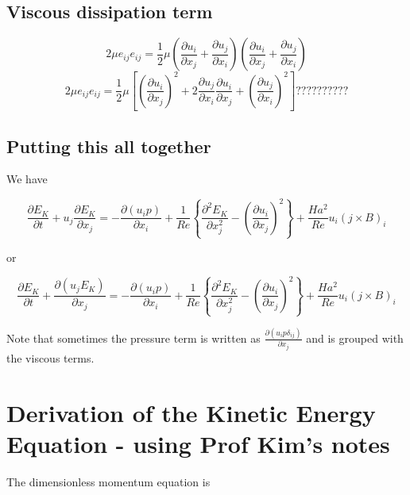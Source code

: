 \documentclass[11pt]{article}
\newcommand{\PD}{\partial}
\begin{document}
\subsection{Viscous dissipation term}
\begin{equation}
	2 \mu e_{ij} e_{ij} = \frac{1}{2} \mu 
	\left( 
	\frac{\PD u_i}{\PD x_j} + \frac{\PD u_j}{\PD x_i}
	\right)
	\left( 
	\frac{\PD u_i}{\PD x_j} + \frac{\PD u_j}{\PD x_i}
	\right)
\end{equation}
\begin{equation}
	2 \mu e_{ij} e_{ij} = \frac{1}{2} \mu 
	\left[
	\left( \frac{\PD u_i}{\PD x_j} \right)^2 + 
	2 \frac{\PD u_j}{\PD x_i} \frac{\PD u_i}{\PD x_j} +
	\left( \frac{\PD u_j}{\PD x_i} \right)^2
	\right]
	??????????
\end{equation}


\subsection{Putting this all together}
We have

\begin{equation}
	\frac{\PD E_K}{\PD t}
	+
	u_j \frac{\PD E_K}{\PD x_j}
	= 
	-
	\frac{\PD (u_i p)}{\PD x_i}
	+
	\frac{1}{Re}
	\left\{
	\frac{\PD^2 E_K}{\PD x_j^2}
	-
	\left( \frac{\PD u_i}{\PD x_j} \right)^2
	\right\}
	+
	\frac{Ha^2}{Re}
	u_i
	(j \times B)_i
\end{equation}

or

\begin{equation}
	\boxed{
	\frac{\PD E_K}{\PD t}
	+
	\frac{\PD (u_j E_K)}{\PD x_j}
	= 
	-
	\frac{\PD (u_i p)}{\PD x_i}
	+
	\frac{1}{Re}
	\left\{
	\frac{\PD^2 E_K}{\PD x_j^2}
	-
	\left( \frac{\PD u_i}{\PD x_j} \right)^2
	\right\}
	+
	\frac{Ha^2}{Re}
	u_i
	(j \times B)_i
	}
\end{equation}

Note that sometimes the pressure term is written as $\frac{\PD (u_i p \delta_{ij})}{\PD x_j}$ and is grouped with the viscous terms.

\section{Derivation of the Kinetic Energy Equation - using Prof Kim's notes}
The dimensionless momentum equation is

\end{document}
